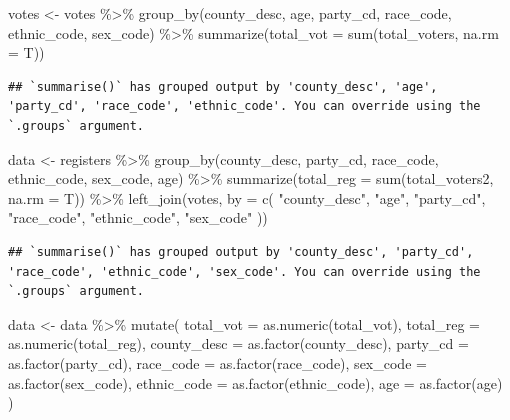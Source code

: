 \documentclass[
]{article}
\newenvironment{Shaded}{\begin{snugshade}}{\end{snugshade}}
\newcommand{\AttributeTok}[1]{\textcolor[rgb]{0.77,0.63,0.00}{#1}}
\newcommand{\FunctionTok}[1]{\textcolor[rgb]{0.00,0.00,0.00}{#1}}
\newcommand{\NormalTok}[1]{#1}
\newcommand{\OtherTok}[1]{\textcolor[rgb]{0.56,0.35,0.01}{#1}}
\newcommand{\SpecialCharTok}[1]{\textcolor[rgb]{0.00,0.00,0.00}{#1}}
\newcommand{\StringTok}[1]{\textcolor[rgb]{0.31,0.60,0.02}{#1}}
\begin{document}
\begin{Shaded}
\begin{Highlighting}[]
\NormalTok{votes }\OtherTok{\textless{}{-}}\NormalTok{ votes }\SpecialCharTok{\%\textgreater{}\%}
  \FunctionTok{group\_by}\NormalTok{(county\_desc, age, party\_cd, race\_code, ethnic\_code, sex\_code) }\SpecialCharTok{\%\textgreater{}\%}
  \FunctionTok{summarize}\NormalTok{(}\AttributeTok{total\_vot =} \FunctionTok{sum}\NormalTok{(total\_voters, }\AttributeTok{na.rm =}\NormalTok{ T))}
\end{Highlighting}
\end{Shaded}

\begin{verbatim}
## `summarise()` has grouped output by 'county_desc', 'age', 'party_cd', 'race_code', 'ethnic_code'. You can override using the `.groups` argument.
\end{verbatim}

\begin{Shaded}
\begin{Highlighting}[]
\NormalTok{data }\OtherTok{\textless{}{-}}\NormalTok{ registers }\SpecialCharTok{\%\textgreater{}\%}
  \FunctionTok{group\_by}\NormalTok{(county\_desc, party\_cd, race\_code, ethnic\_code, sex\_code, age) }\SpecialCharTok{\%\textgreater{}\%}
  \FunctionTok{summarize}\NormalTok{(}\AttributeTok{total\_reg =} \FunctionTok{sum}\NormalTok{(total\_voters2, }\AttributeTok{na.rm =}\NormalTok{ T)) }\SpecialCharTok{\%\textgreater{}\%}
  \FunctionTok{left\_join}\NormalTok{(votes, }\AttributeTok{by =} \FunctionTok{c}\NormalTok{(}
    \StringTok{"county\_desc"}\NormalTok{, }\StringTok{"age"}\NormalTok{, }\StringTok{"party\_cd"}\NormalTok{, }\StringTok{"race\_code"}\NormalTok{, }\StringTok{"ethnic\_code"}\NormalTok{, }\StringTok{"sex\_code"}
\NormalTok{  ))}
\end{Highlighting}
\end{Shaded}

\begin{verbatim}
## `summarise()` has grouped output by 'county_desc', 'party_cd', 'race_code', 'ethnic_code', 'sex_code'. You can override using the `.groups` argument.
\end{verbatim}

\begin{Shaded}
\begin{Highlighting}[]
\NormalTok{data }\OtherTok{\textless{}{-}}\NormalTok{ data }\SpecialCharTok{\%\textgreater{}\%}
  \FunctionTok{mutate}\NormalTok{(}
    \AttributeTok{total\_vot =} \FunctionTok{as.numeric}\NormalTok{(total\_vot), }
    \AttributeTok{total\_reg =} \FunctionTok{as.numeric}\NormalTok{(total\_reg), }
    \AttributeTok{county\_desc =} \FunctionTok{as.factor}\NormalTok{(county\_desc), }
    \AttributeTok{party\_cd =} \FunctionTok{as.factor}\NormalTok{(party\_cd), }
    \AttributeTok{race\_code =} \FunctionTok{as.factor}\NormalTok{(race\_code), }
    \AttributeTok{sex\_code =} \FunctionTok{as.factor}\NormalTok{(sex\_code), }
    \AttributeTok{ethnic\_code =} \FunctionTok{as.factor}\NormalTok{(ethnic\_code), }
    \AttributeTok{age =} \FunctionTok{as.factor}\NormalTok{(age)}
\NormalTok{  )}
\end{Highlighting}
\end{Shaded}
\end{document}
